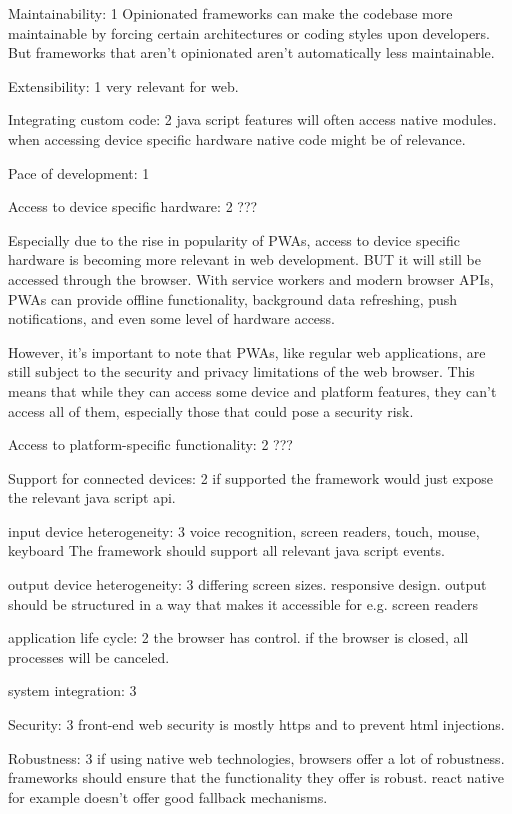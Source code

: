 Maintainability:
1
Opinionated frameworks can make the codebase more maintainable by forcing certain architectures or coding styles upon developers. 
But frameworks that aren't opinionated aren't automatically less maintainable.

Extensibility:
1
very relevant for web.

Integrating custom code:
2
java script features will often access native modules. 
when accessing device specific hardware native code might be of relevance. 

Pace of development: 
1

Access to device specific hardware:
2
???

Especially due to the rise in popularity of PWAs, access to device specific hardware is becoming more relevant in web development.
BUT it will still be accessed through the browser. 
With service workers and modern browser APIs, PWAs can provide offline functionality, background data refreshing, push notifications, and even some level of hardware access.

However, it's important to note that PWAs, like regular web applications, are still subject to the security and privacy limitations of the web browser. This means that while they can access some device and platform features, they can't access all of them, especially those that could pose a security risk.



Access to platform-specific functionality:
2
???

Support for connected devices:
2
if supported the framework would just expose the relevant java script api.

input device heterogeneity:
3
voice recognition, screen readers, touch, mouse, keyboard
The framework should support all relevant java script events.

output device heterogeneity:
3
differing screen sizes. responsive design. 
output should be structured in a way that makes it accessible for e.g. screen readers

application life cycle:
2
the browser has control. if the browser is closed, all processes will be canceled. 

system integration:
3

Security:
3
front-end web security is mostly https and to prevent html injections.

Robustness:
3
if using native web technologies, browsers offer a lot of robustness. 
frameworks should ensure that the functionality they offer is robust.
react native for example doesn't offer good fallback mechanisms.

